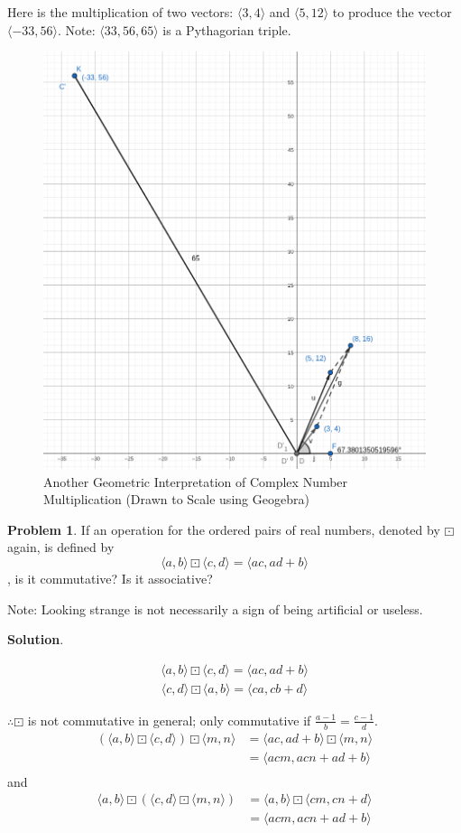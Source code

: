 \documentclass[english,notitlepage,smartquotes]{hgbreport}
\theoremstyle{definition}
\theoremstyle{definition}
\newtheorem{problem}{Problem}
\theoremstyle{remark}
\theoremstyle{plain}
\theoremstyle{definition}
\theoremstyle{definition}
\begin{document}
Here is the multiplication of two vectors: $\langle 3,4\rangle$ and $\langle 5,12\rangle$ to produce the vector $\langle -33,56\rangle$. Note: $\langle 33,56,65\rangle$ is a Pythagorian triple.
\begin{figure}[h]
\begin{center}
\caption{Another Geometric Interpretation of Complex Number Multiplication (Drawn to Scale using Geogebra)}
\label{fig:complexmult2}
\includegraphics[width=.5\textwidth]{c1xc2-2} 
\end{center}
\end{figure}

\begin{problem}
\label{pr:affine}
If an operation for the ordered pairs of real numbers, denoted by $\boxdot$ again, is defined by
$$
\langle a,b\rangle\boxdot\langle c,d\rangle=\langle ac,ad+b\rangle
$$
, is it commutative? Is it associative?

Note: Looking strange is not necessarily a sign of being artificial or useless.
\end{problem}

\textbf{Solution}.

\begin{align*}
\langle a,b\rangle\boxdot\langle c,d\rangle=\langle ac,ad+b\rangle
\end{align*}
\begin{align*}
\langle c,d\rangle\boxdot\langle a,b\rangle=\langle ca,cb+d\rangle
\end{align*}

$\therefore \boxdot$ is not commutative in general; only commutative if $\frac{a-1}{b}=\frac{c-1}{d}$.
\begin{align*}
(\langle a,b\rangle\boxdot\langle c,d\rangle)\boxdot\langle m, n\rangle
&=\langle ac, ad+b\rangle\boxdot\langle m,n\rangle\\
&=\langle acm,acn+ad+b\rangle\\
\end{align*}
and
\begin{align*}
\langle a,b\rangle\boxdot(\langle c,d\rangle\boxdot\langle m, n\rangle)
&=\langle a,b\rangle\boxdot\langle cm,cn+d\rangle\\
&=\langle acm,acn+ad+b\rangle\\
\end{align*}
\end{document}
